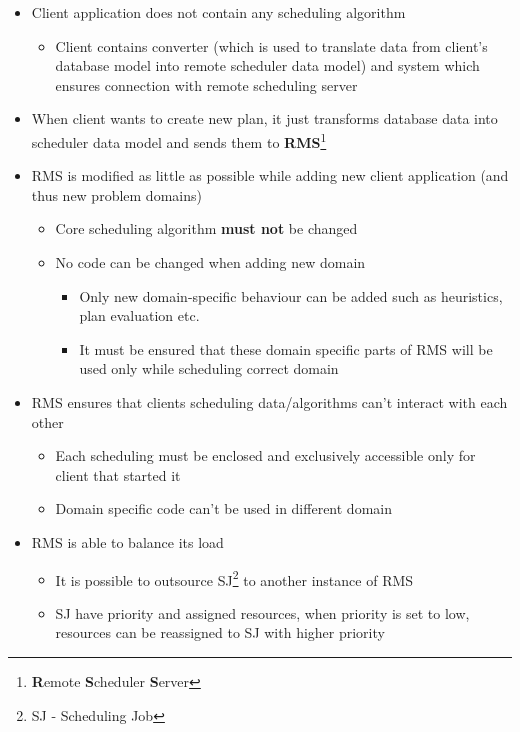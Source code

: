 \begin{itemize}
    \item  Client application does not contain any scheduling algorithm
    \begin{itemize}
        \item Client contains converter (which is used to translate data from client's database model into remote scheduler data model) and system which
        ensures connection with remote scheduling server
    \end{itemize}
    \item When client wants to create new plan, it just transforms database data into scheduler data model and sends them to
    \textbf{RMS}\footnote{\textbf{R}emote \textbf{S}cheduler \textbf{S}erver}
    \item RMS is modified as little as possible while adding new client application (and thus new problem domains)
    \begin{itemize}
        \item Core scheduling algorithm \textbf{must not} be changed
        \item No code can be changed when adding new domain
        \begin{itemize}
            \item Only new domain-specific behaviour can be added such as heuristics, plan evaluation etc.
            \item It must be ensured that these domain specific parts of RMS will be used only while scheduling correct domain
        \end{itemize}
    \end{itemize}
    \item RMS ensures that clients scheduling data/algorithms can't interact with each other
    \begin{itemize}
        \item Each scheduling must be enclosed and exclusively accessible only for client that started it
        \item Domain specific code can't be used in different domain
    \end{itemize}
    \item RMS is able to balance its load
    \begin{itemize}
        \item It is possible to outsource SJ\footnote{SJ - Scheduling Job} to another instance of RMS
        \item SJ have priority and assigned resources, when priority is set to low, resources can be reassigned to SJ with higher priority

\end{itemize}
\end{itemize}
